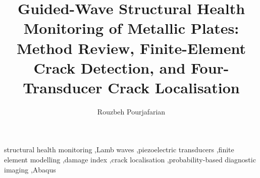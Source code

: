 \documentclass[preprint,12pt]{elsarticle}
\begin{document}
\begin{frontmatter}

\title{Guided-Wave Structural Health Monitoring of Metallic Plates:
Method Review, Finite-Element Crack Detection, and Four-Transducer Crack Localisation}

\author{Rouzbeh Pourjafarian}
\address{Department of Aerospace Engineering, Sharif University of Technology, Tehran, Iran}

\begin{abstract}

\end{abstract}

\begin{keyword}
structural health monitoring \sep Lamb waves \sep piezoelectric transducers \sep finite element modelling
\sep damage index \sep crack localisation \sep probability-based diagnostic imaging \sep Abaqus
\end{keyword}

\end{frontmatter}

\tableofcontents
\newpage




\end{document}
